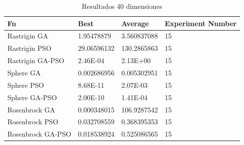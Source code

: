 \documentclass[runningheads]{llncs}
\begin{document}

            \begin{table}[htp]
              \caption{Resultados 40 dimensiones}
              \label{table:resultados-2}
              \centering
              \begin{tabular}{|l|l|l|l|}
              \hline
              Fn & Best & Average & Experiment Number \\
              \hline
              \hline
              Rastrigin GA & 1.95478879 & 3.560837088 & 15\\
              \hline
              Rastrigin PSO & 29.06596132 & 130.2865863 & 15\\
              \hline
              Rastrigin GA-PSO & 2.46E-04 & 2.13E+00 & 15\\
              \hline
              Sphere GA & 0.002686956 & 0.005302951 & 15\\
              \hline
              Sphere PSO & 8.68E-11 & 2.07E-03 & 15\\
              \hline
              Sphere GA-PSO & 2.00E-10 & 1.41E-04 & 15\\
              \hline
              Rosenbrock GA & 0.000348015 & 106.9287542 & 15\\
              \hline
              Rosenbrock PSO & 0.032708559 & 0.368395353 & 15\\
              \hline
              Rosenbrock GA-PSO & 0.018538924 & 0.525086565 & 15\\
              \hline
              \end{tabular}
            \end{table}
\end{document}
